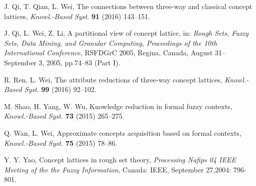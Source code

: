 \documentclass[11pt]{article}
\numberwithin{equation}{subsection}
\begin{document}
\begin{thebibliography}{aa}
J. Qi, T. Qian, L. Wei, The connections between three-way and classical concept lattices, \textit{Knowl.-Based Syst}. \textbf{91} (2016) 143--151.


J. Qi, L. Wei, Z. Li, A partitional view of concept lattice, in: \textit{Rough Sets, Fuzzy Sets, Data Mining, and Granular Computing, Proceedings of the 10th International Conference}, RSFDGrC 2005, Regina, Canada, August 31--September 3,  2005, pp.74--83 (Part I).



 R. Ren, L. Wei, The attribute reductions of three-way concept lattices, \textit{Knowl.-Based Syst}. \textbf{99} (2016) 92--102.



M. Shao, H. Yang, W. Wu, Knowledge reduction in formal fuzzy contexts, \textit{Knowl.-Based Syst.} \textbf{73} (2015) 265--275.

Q. Wan, L. Wei, Approximate concepts acquisition based on formal contexts, \textit{Knowl.-Based Syst.} \textbf{75} (2015) 78--86.

Y. Y. Yao,  Concept lattices in rough set theory,  \textit{Processing Nafips 04 IEEE Meeting of the the Fuzzy Information},
Canada: IEEE,  September 27,2004: 796-801.



\end{thebibliography}
\end{document}
